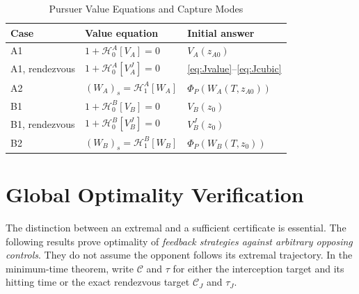 \documentclass[journal,a4paper]{IEEEtran}
\newcommand{\C}{\mathcal C}
\newcommand{\HH}{\mathcal H}
\begin{document}
\begin{table}[t]
\caption{Pursuer Value Equations and Capture Modes}
\label{tab:four}
\centering
\begin{tabular}{@{}lll@{}}
\toprule
Case & Value equation & Initial answer\\
\midrule
A1 & $1+\HH^A_0[V_A]=0$ & $V_A(z_{A0})$\\
A1, rendezvous & $1+\HH^A_0[V_A^J]=0$ & \eqref{eq:Jvalue}--\eqref{eq:Jcubic}\\
A2 & $(W_A)_s=\HH^A_1[W_A]$ & $\Phi_P(W_A(T,z_{A0}))$\\
B1 & $1+\HH^B_0[V_B]=0$ & $V_B(z_0)$\\
B1, rendezvous & $1+\HH^B_0[V_B^J]=0$ & $V_B^J(z_0)$\\
B2 & $(W_B)_s=\HH^B_1[W_B]$ & $\Phi_P(W_B(T,z_0))$\\
\bottomrule
\end{tabular}
\end{table}

\section{Global Optimality Verification}
\label{sec:verification}
The distinction between an extremal and a sufficient certificate is essential. The following results prove optimality of \emph{feedback strategies against arbitrary opposing controls}. They do not assume the opponent follows its extremal trajectory. In the minimum-time theorem, write $\C$ and $\tau$ for either the interception target and its hitting time or the exact rendezvous target $\C_J$ and $\tau_J$.
\end{document}
